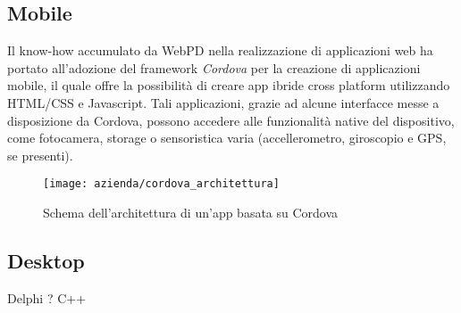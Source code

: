 \subsection{Mobile}
Il know-how accumulato da WebPD nella realizzazione di applicazioni web ha portato all'adozione del framework \textit{Cordova} per la creazione di applicazioni mobile, il quale offre la possibilità di creare app ibride cross platform utilizzando HTML/CSS e Javascript. Tali applicazioni, grazie ad alcune interfacce messe a disposizione da Cordova, possono accedere alle funzionalità native del dispositivo, come fotocamera, storage o sensoristica varia (accellerometro, giroscopio e GPS, se presenti).

\begin{figure}[!h] 
	\centering 
	\texttt{[image: azienda/cordova\_architettura]} 
	\caption{Schema dell'architettura di un'app basata su Cordova}
\end{figure}

\subsection{Desktop}
Delphi ? C++